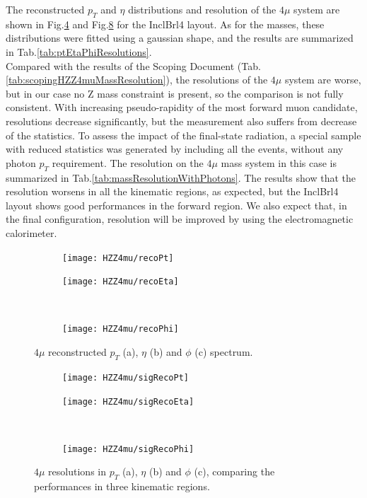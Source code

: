 \documentclass[a4paper,twoside,12pt]{book}
\begin{document}
The reconstructed $p_T$ and $\eta$ distributions and resolution of the $4\mu$ system 
are shown in Fig.\ref{fig:HZZ4mu:recoPtEtaPhi} and Fig.\ref{fig:HZZ4mu:sigRecoPtEtaPhi} for the
InclBrl4 layout. As for the masses, these distributions were fitted using a gaussian shape, 
and the results are summarized in Tab.\ref{tab:ptEtaPhiResolutions}. \\

Compared with the results of the Scoping Document (Tab.\ref{tab:scopingHZZ4muMassResolution}), the resolutions
of the $4\mu$ system are worse, but in our case no Z mass constraint is present, so the comparison
is not fully consistent. With increasing pseudo-rapidity of the most forward muon candidate,
resolutions decrease significantly, but the measurement also suffers from 
decrease of the statistics. To assess the impact of the final-state radiation, a special sample
with reduced statistics was generated by including all the events, without 
any photon $p_{T}$ requirement. The resolution on the $4\mu$ mass system in this case is summarized
in Tab.\ref{tab:massResolutionWithPhotons}. The results show that the resolution worsens in all the kinematic regions, as expected, 
but the InclBrl4
layout shows good performances in the forward region. We also expect that, in the
final configuration, resolution will be improved by using the electromagnetic calorimeter.

\begin{figure}
\begin{subfigure}{.5\linewidth}
\texttt{[image: HZZ4mu/recoPt]}
\caption{}
\label{fig:HZZ4mu:recoPt}
\end{subfigure}
\begin{subfigure}{.5\linewidth}
\centering
\texttt{[image: HZZ4mu/recoEta]}
\caption{}
\label{fig:HZZ4mu:recoEta}
\end{subfigure}\\[1ex]
\begin{subfigure}{\linewidth}
\centering
\texttt{[image: HZZ4mu/recoPhi]}
\caption{}
\label{fig:HZZ4mu:recoPhi}
\end{subfigure}
\caption{$4\mu$ reconstructed $p_{T}$ (a), $\eta$ (b) and $\phi$ (c) spectrum.}
\label{fig:HZZ4mu:recoPtEtaPhi}
\end{figure}

\begin{figure}
\begin{subfigure}{.5\linewidth}
\texttt{[image: HZZ4mu/sigRecoPt]}
\caption{}
\label{fig:HZZ4mu:sigRecoPt}
\end{subfigure}
\begin{subfigure}{.5\linewidth}
\centering
\texttt{[image: HZZ4mu/sigRecoEta]}
\caption{}
\label{fig:HZZ4mu:sigRecoEta}
\end{subfigure}\\[1ex]
\begin{subfigure}{\linewidth}
\centering
\texttt{[image: HZZ4mu/sigRecoPhi]}
\caption{}
\label{fig:HZZ4mu:sigRecoPhi}
\end{subfigure}
\caption{$4\mu$ resolutions in $p_{T}$ (a), $\eta$ (b) and $\phi$ (c), comparing
	the performances in three kinematic regions.}
\label{fig:HZZ4mu:sigRecoPtEtaPhi}
\end{figure}
\end{document}
